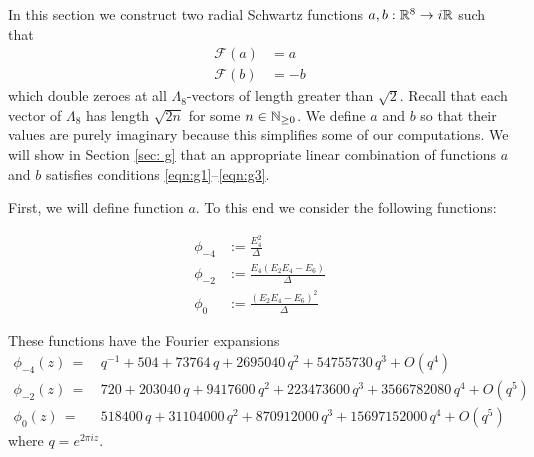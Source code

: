 
In this section we construct two radial Schwartz functions $a,b:\mathbb{R}^8\to i\mathbb{R}$ such that
\begin{align}\mathcal{F}(a)&=a\label{eqn:a-fourier}\\
    \mathcal{F}(b)&=-b\label{eqn:b-fourier}
\end{align}
which double zeroes at all $\Lambda_8$-vectors of length greater than $\sqrt{2}$. Recall that each vector of $\Lambda_8$ has length $\sqrt{2n}$ for some $n\in\mathbb{N}_{\geq 0}$. We define $a$ and $b$ so that their values are purely imaginary because this simplifies some of our computations. We will show in Section \ref{sec: g} that an appropriate linear combination of functions $a$ and $b$ satisfies conditions \eqref{eqn:g1}--\eqref{eqn:g3}.

First, we will define function $a$. To this end we consider the following functions:
\begin{definition}\label{def: phi4 phi2 phi0}
\begin{align}
    \phi_{-4} &:= \frac{E_4^2}{\Delta} \label{eqn: def phi4} \\
    \phi_{-2} &:= \frac{E_4(E_2 E_4 - E_6)}{\Delta} \label{eqn: def phi2} \\
    \phi_{0} &:= \frac{(E_2 E_4 - E_6)^2}{\Delta} \label{eqn: def phi0}
\end{align}
\end{definition}

\begin{lemma}\label{lemma: phi fourier4 phi fourier2 phi fourier0}
    These functions have the Fourier expansions
\begin{align}
    \phi_{-4}(z)\,=\,&q^{-1} + 504 + 73764\, q + 2695040\, q^2 + 54755730\, q^3 + O(q^4)\label{eqn: phi fourier4}\\
    \phi_{-2}(z)\,=\,&720 + 203040\, q + 9417600\, q^2 + 223473600\, q^3 + 3566782080\, q^4+O(q^5)\label{eqn: phi fourier2}\\
    \phi_{0}(z)\,=\,&518400\, q + 31104000\, q^2 + 870912000\, q^3 + 15697152000\, q^4+O(q^5)\label{eqn: phi fourier0}
\end{align}
where $q=e^{2\pi i z}$.
\end{lemma}

